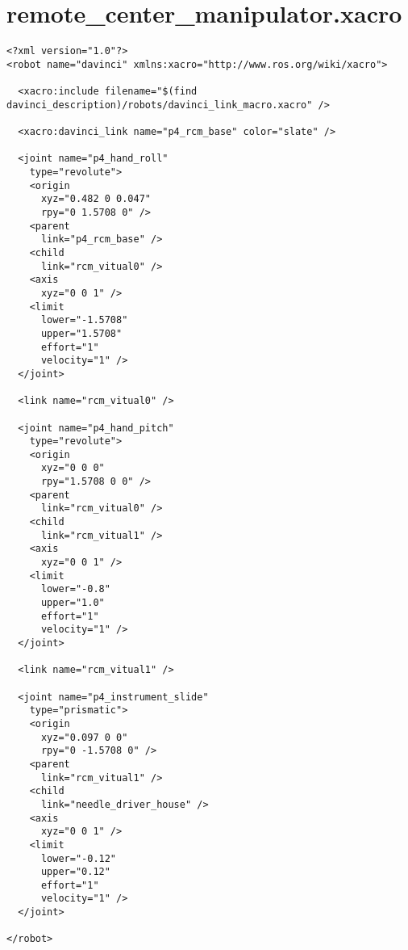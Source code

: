 \section*{remote\_center\_manipulator.xacro}
\begin{lstlisting}[language=gedit]
<?xml version="1.0"?>
<robot name="davinci" xmlns:xacro="http://www.ros.org/wiki/xacro">

  <xacro:include filename="$(find davinci_description)/robots/davinci_link_macro.xacro" />

  <xacro:davinci_link name="p4_rcm_base" color="slate" />

  <joint name="p4_hand_roll"
    type="revolute">
    <origin
      xyz="0.482 0 0.047"
      rpy="0 1.5708 0" />
    <parent
      link="p4_rcm_base" />
    <child
      link="rcm_vitual0" />
    <axis
      xyz="0 0 1" />
    <limit
      lower="-1.5708"
      upper="1.5708"
      effort="1"
      velocity="1" />
  </joint>

  <link name="rcm_vitual0" />

  <joint name="p4_hand_pitch"
    type="revolute">
    <origin
      xyz="0 0 0"
      rpy="1.5708 0 0" />
    <parent
      link="rcm_vitual0" />
    <child
      link="rcm_vitual1" />
    <axis
      xyz="0 0 1" />
    <limit
      lower="-0.8"
      upper="1.0"
      effort="1"
      velocity="1" />
  </joint>

  <link name="rcm_vitual1" />

  <joint name="p4_instrument_slide"
    type="prismatic">
    <origin
      xyz="0.097 0 0"
      rpy="0 -1.5708 0" />
    <parent
      link="rcm_vitual1" />
    <child
      link="needle_driver_house" />
    <axis
      xyz="0 0 1" />
    <limit
      lower="-0.12"
      upper="0.12"
      effort="1"
      velocity="1" />
  </joint>

</robot>
\end{lstlisting}